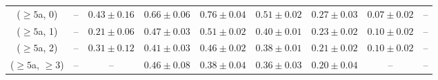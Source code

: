 \begin{table}[h!]
{\begin{tabular}{ccccccccc}
	($\ge5$a, 0) & -- & $0.43\pm 0.16$ & $0.66\pm 0.06$ & $0.76\pm 0.04$ & $0.51\pm 0.02$ & $0.27\pm 0.03$ & $0.07\pm 0.02$ & -- \\[0.5ex] 
	($\ge5$a, 1) & -- & $0.21\pm 0.06$ & $0.47\pm 0.03$ & $0.51\pm 0.02$ & $0.40\pm 0.01$ & $0.23\pm 0.02$ & $0.10\pm 0.02$ & -- \\[0.5ex] 
	($\ge5$a, 2) & -- & $0.31\pm 0.12$ & $0.41\pm 0.03$ & $0.46\pm 0.02$ & $0.38\pm 0.01$ & $0.21\pm 0.02$ & $0.10\pm 0.02$ & -- \\[0.5ex] 
	($\ge5$a, $\ge3$) & -- & -- & $0.46\pm 0.08$ & $0.38\pm 0.04$ & $0.36\pm 0.03$ & $0.20\pm 0.04$ & -- & -- \\[0.5ex] 
	\hline
	\hline
\end{tabular}}
\end{table}
